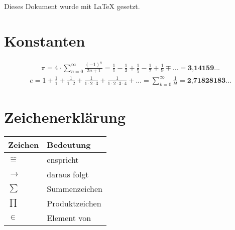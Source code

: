\documentclass[12pt,a4paper,fleqn,twoside,pdf,final]{scrartcl}
\begin{document}
\maketitle
\thispagestyle{empty}


\vfill
 



\doclicenseThis


\pagebreak



\setcounter{tocdepth}{1}
\tableofcontents
\thispagestyle{empty}


\vfill

\begin{center}
\small{Dieses Dokument wurde mit \LaTeX{} gesetzt.}
\end{center}

\newpage

\clearpage
{} 


\pagebreak


\pagebreak










\section{Konstanten}
\begin{align*} 
\pi =  4 \cdot \sum_{n=0}^\infty  \frac{(-1)^n}{2n+1} = \frac{1}{1} -  \frac{1}{3} +  \frac{1}{5} -  \frac{1}{7} + \frac{1}{9} \mp ... = \textbf{3,14159}...
\end{align*}
\begin{align*} 
e = 1 + \frac{1}{1}+\frac{1}{1 \cdot 2}+\frac{1}{1 \cdot 2  \cdot 3}+\frac{1}{1 \cdot 2  \cdot 3  \cdot 4}+... = \sum_{k=0}^\infty \frac{1}{k!} = \textbf{2,71828183}...
\end{align*}


\section{Zeichenerklärung}

\begin{tabular}[h]{l|l}
Zeichen &Bedeutung  \\
\hline
$\widehat{=}$ & enspricht  \\
$\longrightarrow$ & daraus folgt \\
$\sum$ & Summenzeichen \\
$\prod$ & Produktzeichen \\
$ \in$ & Element von \\
\end{tabular}
\end{document}
